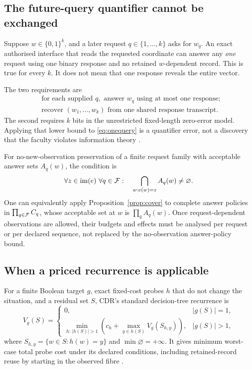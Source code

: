 \subsection{The future-query quantifier cannot be exchanged}

Suppose \(w\in\{0,1\}^k\), and a later request \(q\in\{1,\ldots,k\}\) asks for \(w_q\). An exact authorised interface that reads the requested coordinate can answer any \emph{one} request using one binary response and no retained \(w\)-dependent record. This is true for every \(k\). It does not mean that one response reveals the entire vector.

The two requirements are
\begin{align}
&\text{for each supplied }q,\text{ answer }w_q\text{ using at most one response};\label{eq:onequery}\\
&\text{recover }(w_1,\ldots,w_k)\text{ from one shared response transcript}.\label{eq:allquery}
\end{align}
The second requires \(k\) bits in the unrestricted fixed-length zero-error model. Applying that lower bound to \eqref{eq:onequery} is a quantifier error, not a discovery that the faculty violates information theory \cite[\S6]{S2}.

For no-new-observation preservation of a finite request family with acceptable answer sets \(A_q(w)\), the condition is
\begin{equation}
\forall z\in\im(e)\ \forall q\in\F:\quad
\bigcap_{w:e(w)=z}A_q(w)\ne\varnothing.
\label{eq:family}
\end{equation}
One can equivalently apply Proposition~\ref{prop:cover} to complete answer policies in \(\prod_{q\in\mathcal F}C_q\), whose acceptable set at \(w\) is \(\prod_q A_q(w)\). Once request-dependent observations are allowed, their budgets and effects must be analysed per request or per declared sequence, not replaced by the no-observation answer-policy bound.

\subsection{When a priced recurrence is applicable}

For a finite Boolean target \(g\), exact fixed-cost probes \(h\) that do not change the situation, and a residual set \(S\), CDR's standard decision-tree recurrence is
\begin{equation}
V_g(S)=
\begin{cases}
0,&|g(S)|=1,\\
\displaystyle\min_{h:\,|h(S)|>1}
\left(c_h+\max_{y\in h(S)}V_g(S_{h,y})\right),&|g(S)|>1,
\end{cases}
\label{eq:priced}
\end{equation}
where \(S_{h,y}=\{w\in S:h(w)=y\}\) and \(\min\varnothing=+\infty\). It gives minimum worst-case total probe cost under its declared conditions, including retained-record reuse by starting in the observed fibre \cite[Theorem 1]{CDR}.

